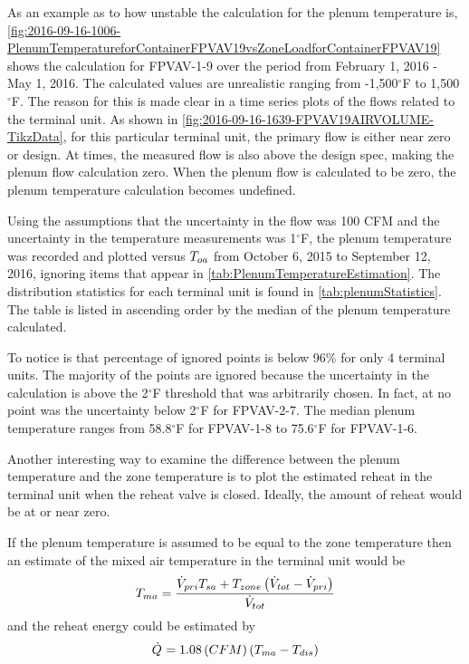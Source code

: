 As an example as to how unstable the calculation for the plenum
temperature is, \figref{}
\ref{fig:2016-09-16-1006-PlenumTemperatureforContainerFPVAV19vsZoneLoadforContainerFPVAV19}
shows the calculation for FPVAV-1-9 over the period from February 1,
2016 - May 1, 2016. The calculated values are unrealistic ranging from
-1,500\(^\circ\)F to 1,500\(^\circ\)F. The reason for this is made clear
in a time series plots of the flows related to the terminal unit. As
shown in \figref{} \ref{fig:2016-09-16-1639-FPVAV19AIRVOLUME-TikzData},
for this particular terminal unit, the primary flow is either near zero
or design. At times, the measured flow is also above the design
spec, making the plenum flow calculation zero. When the plenum flow is
calculated to be zero, the plenum temperature calculation becomes
undefined.

Using the assumptions that the uncertainty in the flow was 100 CFM and
the uncertainty in the temperature measurements was 1\(^\circ\)F, the
plenum temperature was recorded and plotted versus \(T_{oa}\) from October
6, 2015 to September 12, 2016, ignoring items that appear in \tableref{}
\ref{tab:PlenumTemperatureEstimation}. The distribution statistics for
each terminal unit is found in \tableref{} \ref{tab:plenumStatistics}.
The table is listed in ascending order by the median of the plenum
temperature calculated.

To notice is that percentage of ignored points is below 96\% for only 4
terminal units.  The majority of the points are ignored because the
uncertainty in the calculation is above the 2\(^\circ\)F threshold that
was arbitrarily chosen.  In fact, at no point was the uncertainty below
2\(^\circ\)F for FPVAV-2-7.  The median plenum temperature ranges from
58.8\(^\circ\)F for FPVAV-1-8 to 75.6\(^\circ\)F for FPVAV-1-6.

Another interesting way to examine the difference between the plenum
temperature and the zone temperature is to plot the estimated reheat in
the terminal unit when the reheat valve is closed.  Ideally, the amount
of reheat would be at or near zero. 

If the plenum temperature is assumed to be equal to the zone temperature
then an estimate of the mixed air temperature in the terminal unit would
be
\begin{equation}
    T_{ma} = \frac{\dot{V}_{pri} T_{sa} + T_{zone} \left( \dot{V}_{tot} - \dot{V}_{pri} \right) }{ \dot{V}_{tot}}
    \label{eq:TerminalUnitMixedAirTemp}
\end{equation}
and the reheat energy could be estimated by
\begin{equation}
    \dot{Q}_{} = 1.08 \left( CFM \right) \left( T_{ma} - T_{dis}  \right)
    \label{eq:TerminalUnitReheatEnergy}
\end{equation}

